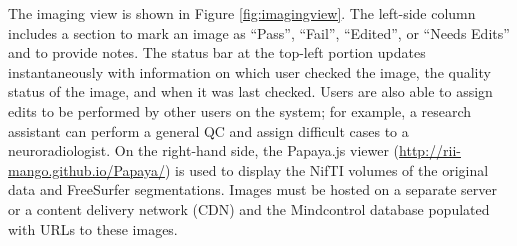 The imaging view is shown in Figure \ref{fig:imagingview}. The left-side column includes a section to mark an image as ``Pass'', ``Fail'', ``Edited'', or ``Needs Edits'' and to provide notes. The status bar at the top-left portion updates instantaneously with information on which user checked the image, the quality status of the image, and when it was last checked. Users are also able to assign edits to be performed by other users on the system; for example, a research assistant can perform a general QC and assign difficult cases to a neuroradiologist. On the right-hand side, the Papaya.js viewer (\href{http://rii-mango.github.io/Papaya/}{http://rii-mango.github.io/Papaya/}) is used to display the NifTI volumes of the original data and FreeSurfer segmentations. Images must be hosted on a separate server or a content delivery network (CDN) and the Mindcontrol database populated with URLs to these images.
